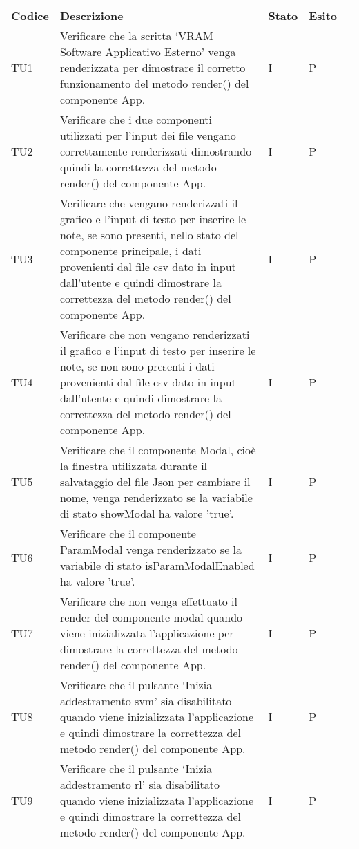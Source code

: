 \begin{longtable} {
		>{}p{15mm} 
		>{}p{79.5mm}
		>{}p{15mm} 
		>{}p{15mm}
		>{}p{0mm}}
	\rowcolor{gray!50}
	\textbf{Codice} & \textbf{Descrizione} & \textbf{Stato} & \textbf{Esito} &\TBstrut \\
	TU1		    & Verificare che la scritta ‘VRAM Software Applicativo Esterno’ venga renderizzata per dimostrare il corretto funzionamento del metodo render() del componente App.& I & P &\TBstrut \\ [2mm]
	TU2			& Verificare che i due componenti utilizzati per l’input dei file vengano correttamente renderizzati dimostrando quindi la correttezza del metodo render() del componente App.& I & P &\TBstrut \\ [2mm]
	TU3			& Verificare che vengano renderizzati il grafico e l'input di testo per inserire le note, se sono presenti, nello stato del componente principale, i dati provenienti dal file csv dato in input dall'utente e quindi dimostrare la correttezza del metodo render() del componente App.& I & P &\TBstrut \\ [2mm]
	TU4			& Verificare che non vengano renderizzati il grafico e l’input di testo per inserire le note, se non sono presenti i dati provenienti dal file csv dato in input dall’utente e quindi dimostrare la correttezza del metodo render() del componente App.& I & P &\TBstrut \\ [2mm]
	TU5			& Verificare che il componente Modal, cioè la finestra utilizzata durante il salvataggio del file Json per cambiare il nome, venga renderizzato se la variabile di stato showModal ha valore 'true'.& I & P &\TBstrut \\ [2mm]
	TU6			& Verificare che il componente ParamModal  venga renderizzato se la variabile di stato isParamModalEnabled ha valore 'true'.& I & P &\TBstrut \\ [2mm]
	TU7			& Verificare che non venga effettuato il render del componente modal quando viene inizializzata l'applicazione per dimostrare la correttezza del metodo render() del componente App.& I & P &\TBstrut \\ [2mm]
	TU8			& Verificare che il pulsante ‘Inizia addestramento svm’ sia disabilitato quando viene inizializzata l’applicazione e quindi dimostrare la correttezza del metodo render() del componente App.& I & P &\TBstrut \\ [2mm]
	TU9			& Verificare che il pulsante ‘Inizia addestramento rl’ sia disabilitato quando viene inizializzata l’applicazione e quindi dimostrare la correttezza del metodo render() del componente App.& I & P &\TBstrut \\ [2mm]

\end{longtable}
